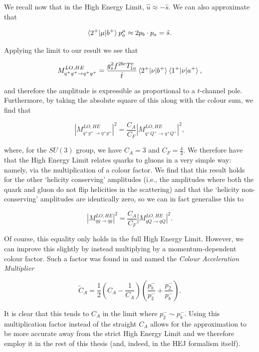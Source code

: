 We recall now that in the High Energy Limit, $\hat{u} \approx -\hat{s}$. We can also approximate that

\begin{equation}
\mathinner{\langle2^+\vert\mu\vert b^+\rangle}_{} p_a^\mu \approx 2 p_b \cdot p_a  = \hat{s}.\end{equation}

Applying the limit to our result we see that 

\begin{equation}
M_{q^+g^+ \to q^+g^+}^{LO, HE} = \frac{g_s^2 f^{2bc}T^c_{1a}}{\hat{t}}\mathinner{\langle2^+\vert\nu\vert b^+\rangle}_{} \mathinner{\langle1^+\vert\nu\vert a^+\rangle}_{},
\end{equation}

and therefore the amplitude is expressible as proportional to a $t$-channel pole. Furthermore, by taking the absolute square of this along with the colour sum, we find that

\begin{equation}
|M_{q^+g^+ \to q^+g^+}^{LO, HE}|^2 = \frac{C_A}{C_F} |M_{q^+Q^+ \to q^+Q^+}^{LO, HE}|^2,
\end{equation}

where, for the $SU(3)$ group, we have $C_A = 3$ and $C_F = \frac{4}{3}$. We therefore have that the High Energy Limit relates quarks to gluons in a very simple way: namely, via the multiplication of a colour factor. We find that this result holds for the other `helicity conserving' amplitudes (i.e., the amplitudes where both the quark and gluon do not flip helicities in the scattering) and that the `helicity non-conserving' amplitudes are identically zero, so we can in fact generalise this to

\begin{equation}
|M_{qg \to qg}^{LO, HE}|^2 = \frac{C_A}{C_F} |M_{qQ \to qQ}^{LO, HE}|^2.
\end{equation}

Of course, this equality only holds in the full High Energy Limit. However, we can improve this slightly by instead multiplying by a momentum-dependent colour factor. Such a factor was found in \cite{Andersen2010} and named the \emph{Colour Acceleration Multiplier}

\begin{equation}
\tilde{C}_A = \frac{1}{2} \left(C_A - \frac{1}{C_A} \right) \left(\frac{p_b^-}{p_2^-} + \frac{p_2^-}{p_b^-} \right).
\label{eqn:CAM}
\end{equation}

It is clear that this tends to $C_A$ in the limit where $p_2^- \sim p_b^-$. Using this multiplication factor instead of the straight $C_A$ allows for the approximation to be more accurate away from the strict High Energy Limit and we therefore employ it in the rest of this thesis (and, indeed, in the HEJ formalism itself). 

